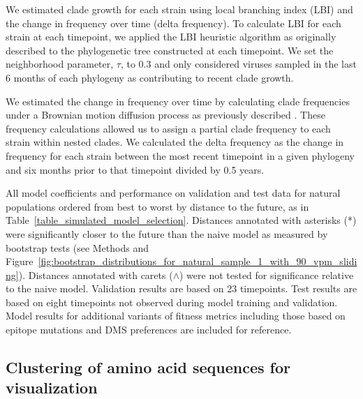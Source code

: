 We estimated clade growth for each strain using local branching index (LBI) and the change in frequency over time (delta frequency).
To calculate LBI for each strain at each timepoint, we applied the LBI heuristic algorithm as originally described \citep{Neher:2014eu} to the phylogenetic tree constructed at each timepoint.
We set the neighborhood parameter, $\tau$, to 0.3 and only considered viruses sampled in the last 6 months of each phylogeny as contributing to recent clade growth.

We estimated the change in frequency over time by calculating clade frequencies under a Brownian motion diffusion process as previously described \citep{Lee2018}.
These frequency calculations allowed us to assign a partial clade frequency to each strain within nested clades.
We calculated the delta frequency as the change in frequency for each strain between the most recent timepoint in a given phylogeny and six months prior to that timepoint divided by 0.5 years.

\begin{table}
  \begin{center}
    \scalebox{0.9}{
        
    }
    \caption{
      All model coefficients and performance on validation and test data for natural populations ordered from best to worst by distance to the future, as in Table~\ref{table_simulated_model_selection}.
      Distances annotated with asterisks (*) were significantly closer to the future than the naive model as measured by bootstrap tests (see Methods and Figure~\ref{fig:bootstrap_distributions_for_natural_sample_1_with_90_vpm_sliding}).
      Distances annotated with carets ($\wedge$) were not tested for significance relative to the naive model.
      Validation results are based on 23 timepoints.
      Test results are based on eight timepoints not observed during model training and validation.
      Model results for additional variants of fitness metrics including those based on epitope mutations and DMS preferences are included for reference.
    }
    \label{table:complete_natural_model_selection}
  \end{center}

\end{table}

\subsection*{Clustering of amino acid sequences for visualization}

